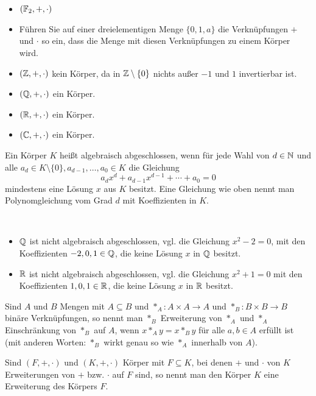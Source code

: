 \begin{bsp}\ 
\begin{itemize} 
	\item $(\mathbb{F}_2,+,\cdot)$
	\item Führen Sie auf einer dreielementigen Menge $\{0,1,a\}$ die Verknüpfungen $+$ und $\cdot$ so ein, dass die Menge mit diesen Verknüpfungen zu einem Körper wird. 
	\item $(\mathbb{Z},+,\cdot)$ kein Körper, da in $\mathbb{Z} \setminus \{0\}$ nichts außer $-1$ und $1$ invertierbar ist. 
	\item $(\mathbb{Q},+,\cdot)$ ein Körper. 
	\item $(\mathbb{R}, + ,\cdot)$ ein Körper. 
	\item $(\mathbb{C}, + ,\cdot)$ ein Körper. 
\end{itemize} 
\end{bsp} 

\begin{defn}
	Ein Körper $K$ heißt algebraisch abgeschlossen, wenn für jede Wahl von $d \in \mathbb{N}$ und alle $a_d \in K \setminus \{0\}, a_{d-1},\ldots,a_0 \in K$ die Gleichung 
	\[
	a_d x^d + a_{d-1} x^{d-1} + \cdots + a_0 = 0
	\]
	mindestens eine Lösung $x$ aus $K$ besitzt. Eine Gleichung wie oben nennt man Polynomgleichung vom Grad $d$ mit Koeffizienten in $K$. 
\end{defn} 

\begin{bsp}\ 
	\begin{itemize} 
		\item $\mathbb{Q}$ ist nicht algebraisch abgeschlossen, vgl. die Gleichung $x^2 - 2 = 0$, mit den Koeffizienten $ -2, 0 , 1 \in \mathbb{Q}$, die keine Lösung $x$ in $\mathbb{Q}$ besitzt. 
		\item $\mathbb{R}$ ist nicht algebraisch abgeschlossen, vgl. die Gleichung $x^2 + 1 = 0$ mit den Koeffizienten $1, 0, 1 \in \mathbb{R}$, die keine Lösung $x$ in $\mathbb{R}$ besitzt. 
	\end{itemize} 
\end{bsp} 

\begin{defn} 
	Sind $A$ und $B$ Mengen mit $A \subseteq B$ und $\ast_A : A \times A \to A$ und $\ast_B : B \times B \to B$ binäre Verknüpfungen, so nennt man $\ast_B$ Erweiterung von $\ast_A$ und $\ast_A$ Einschränkung von $\ast_B$ auf $A$, wenn $x \ast_A y = x \ast_B y$ für alle $a,b \in A$ erfüllt ist (mit anderen Worten: $\ast_B$ wirkt genau so wie $\ast_A$ innerhalb von $A$). 
\end{defn} 

\begin{defn}
	Sind $(F,+,\cdot)$ und $(K,+,\cdot)$ Körper mit $F \subseteq K$, bei denen $+$ und $\cdot$ von $K$ Erweiterungen von $+$ bzw. $\cdot$ auf $F$ sind, so nennt man den Körper $K$ eine Erweiterung des Körpers $F$. 
\end{defn} 

